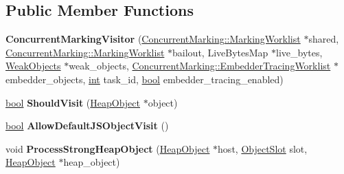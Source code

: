 \subsection*{Public Member Functions}
\begin{DoxyCompactItemize}
\item 
\mbox{\label{classv8_1_1internal_1_1ConcurrentMarkingVisitor_a15f4fc8a0f119de974bc7d3aa6391fb7}} 
{\bfseries Concurrent\+Marking\+Visitor} (\mbox{\hyperlink{classv8_1_1internal_1_1Worklist}{Concurrent\+Marking\+::\+Marking\+Worklist}} $\ast$shared, \mbox{\hyperlink{classv8_1_1internal_1_1Worklist}{Concurrent\+Marking\+::\+Marking\+Worklist}} $\ast$bailout, Live\+Bytes\+Map $\ast$live\+\_\+bytes, \mbox{\hyperlink{structv8_1_1internal_1_1WeakObjects}{Weak\+Objects}} $\ast$weak\+\_\+objects, \mbox{\hyperlink{classv8_1_1internal_1_1Worklist}{Concurrent\+Marking\+::\+Embedder\+Tracing\+Worklist}} $\ast$embedder\+\_\+objects, \mbox{\hyperlink{classint}{int}} task\+\_\+id, \mbox{\hyperlink{classbool}{bool}} embedder\+\_\+tracing\+\_\+enabled)
\item 
\mbox{\label{classv8_1_1internal_1_1ConcurrentMarkingVisitor_a33a4fd062f35cb07ddcc8d0c4cc57142}} 
\mbox{\hyperlink{classbool}{bool}} {\bfseries Should\+Visit} (\mbox{\hyperlink{classv8_1_1internal_1_1HeapObject}{Heap\+Object}} $\ast$object)
\item 
\mbox{\label{classv8_1_1internal_1_1ConcurrentMarkingVisitor_a7e203272819fa27ca2958dc453894baf}} 
\mbox{\hyperlink{classbool}{bool}} {\bfseries Allow\+Default\+J\+S\+Object\+Visit} ()
\item 
\mbox{\label{classv8_1_1internal_1_1ConcurrentMarkingVisitor_a1c54108c56df2cb2f05fcab8f65cf491}} 
void {\bfseries Process\+Strong\+Heap\+Object} (\mbox{\hyperlink{classv8_1_1internal_1_1HeapObject}{Heap\+Object}} $\ast$host, \mbox{\hyperlink{classv8_1_1internal_1_1ObjectSlot}{Object\+Slot}} slot, \mbox{\hyperlink{classv8_1_1internal_1_1HeapObject}{Heap\+Object}} $\ast$heap\+\_\+object)
\item 
\mbox{\label{classv8_1_1internal_1_1ConcurrentMarkingVisitor_aa7002afa883cdf6980ef62d729d3b17a}} 

\end{DoxyCompactItemize}
